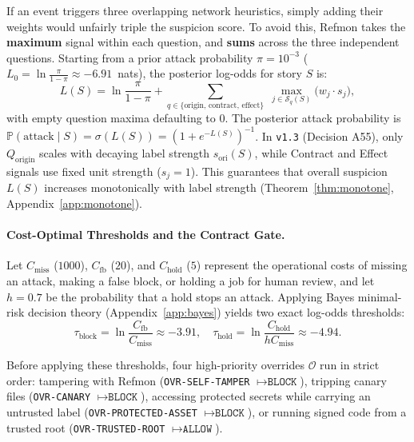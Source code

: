 \documentclass[10pt,twocolumn,letterpaper]{article}
\makeatletter
\theoremstyle{plain}
\theoremstyle{definition}
\theoremstyle{remark}
\DeclareRobustCommand{\_}{\ifmmode\nfss@text{\textunderscore}\else\textunderscore\penalty\@highpenalty\hskip\z@skip\fi}
\makeatother
\begin{document}
If an event triggers three overlapping network heuristics, simply adding their weights would unfairly triple the suspicion score. To avoid this, Refmon takes the \textbf{maximum} signal within each question, and \textbf{sums} across the three independent questions. Starting from a prior attack probability $\pi = 10^{-3}$ ($L_0 = \ln\frac{\pi}{1-\pi} \approx -6.91$~nats), the posterior log-odds for story $S$ is:
\begin{equation}
  L(S) = \ln\frac{\pi}{1 - \pi} + \sum_{q \in \{\text{origin},\,\text{contract},\,\text{effect}\}} \;\max_{j \in \mathcal{S}_q(S)} \big(w_j \cdot s_j\big),
  \label{eq:logodds}
\end{equation}
with empty question maxima defaulting to $0$. The posterior attack probability is $\mathbb{P}(\text{attack} \mid S) = \sigma(L(S)) = (1 + e^{-L(S)})^{-1}$. In \texttt{v1.3} (Decision A55), only $Q_{\text{origin}}$ scales with decaying label strength $s_{\text{ori}}(S)$, while Contract and Effect signals use fixed unit strength ($s_j = 1$). This guarantees that overall suspicion $L(S)$ increases monotonically with label strength (Theorem~\ref{thm:monotone}, Appendix~\ref{app:monotone}).

\paragraph{Cost-Optimal Thresholds and the Contract Gate.} Let $C_{\text{miss}}$ ($1000$), $C_{\text{fb}}$ ($20$), and $C_{\text{hold}}$ ($5$) represent the operational costs of missing an attack, making a false block, or holding a job for human review, and let $h = 0.7$ be the probability that a hold stops an attack. Applying Bayes minimal-risk decision theory (Appendix~\ref{app:bayes}) yields two exact log-odds thresholds:
\begin{equation}
  \tau_{\text{block}} = \ln\frac{C_{\text{fb}}}{C_{\text{miss}}} \approx -3.91,\quad
  \tau_{\text{hold}} = \ln\frac{C_{\text{hold}}}{h C_{\text{miss}}} \approx -4.94.
  \label{eq:thresholds}
\end{equation}

Before applying these thresholds, four high-priority overrides $\mathcal{O}$ run in strict order: tampering with Refmon (\texttt{OVR-SELF-TAMPER} $\mapsto \texttt{BLOCK}$), tripping canary files (\texttt{OVR-CANARY} $\mapsto \texttt{BLOCK}$), accessing protected secrets while carrying an untrusted label (\texttt{OVR-PROTECTED-ASSET} $\mapsto \texttt{BLOCK}$), or running signed code from a trusted root (\texttt{OVR-TRUSTED-ROOT} $\mapsto \texttt{ALLOW}$).
\end{document}
